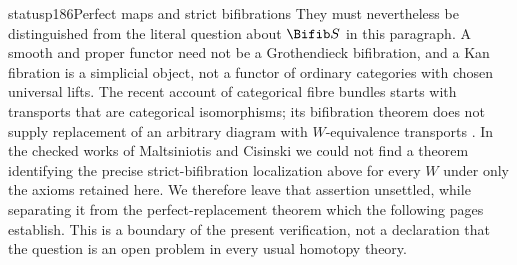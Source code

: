 \begin{dcomment}{status}{p186}{Perfect maps and strict bifibrations}
They must nevertheless be distinguished from the literal question about $\Bifib S$ in this paragraph. A smooth and proper functor need not be a Grothendieck bifibration, and a Kan fibration is a simplicial object, not a functor of ordinary categories with chosen universal lifts. The recent account of categorical fibre bundles starts with transports that are categorical isomorphisms; its bifibration theorem does not supply replacement of an arbitrary diagram with $W$-equivalence transports \citep[\S3 and Theorem~4.5]{CarcaciaCampos2026}. In the checked works of Maltsiniotis and Cisinski we could not find a theorem identifying the precise strict-bifibration localization above for every $W$ under only the axioms retained here. We therefore leave that assertion unsettled, while separating it from the perfect-replacement theorem which the following pages establish. This is a boundary of the present verification, not a declaration that the question is an open problem in every usual homotopy theory.
\end{dcomment}


